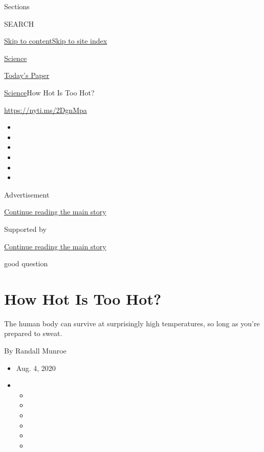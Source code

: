 Sections

SEARCH

\protect\hyperlink{site-content}{Skip to
content}\protect\hyperlink{site-index}{Skip to site index}

\href{https://www.nytimes.com/section/science}{Science}

\href{https://myaccount.nytimes.com/auth/login?response_type=cookie\&client_id=vi}{}

\href{https://www.nytimes.com/section/todayspaper}{Today's Paper}

\href{/section/science}{Science}\textbar{}How Hot Is Too Hot?

\url{https://nyti.ms/2DgnMpa}

\begin{itemize}
\item
\item
\item
\item
\item
\item
\end{itemize}

Advertisement

\protect\hyperlink{after-top}{Continue reading the main story}

Supported by

\protect\hyperlink{after-sponsor}{Continue reading the main story}

good question

\hypertarget{how-hot-is-too-hot}{%
\section{How Hot Is Too Hot?}\label{how-hot-is-too-hot}}

The human body can survive at surprisingly high temperatures, so long as
you're prepared to sweat.

By Randall Munroe

\begin{itemize}
\item
  Aug. 4, 2020
\item
  \begin{itemize}
  \item
  \item
  \item
  \item
  \item
  \item
  \end{itemize}
\end{itemize}

